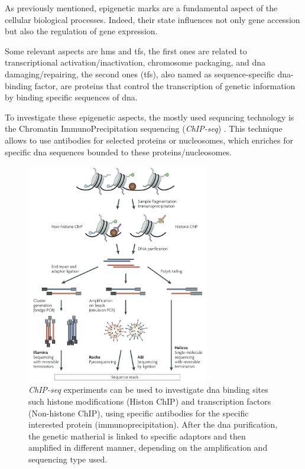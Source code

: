 As previously mentioned, epigenetic marks are a fundamental aspect of the cellular biological processes. 
Indeed, their state influences not only gene accession but also the regulation of gene expression.

Some relevant aspects are \glspl{hm} and \glspl{tf}, the first ones are related to transcriptional activation/inactivation, chromosome packaging, and \gls{dna} damaging/repairing, the second ones (\glspl{tf}), also named as sequence-specific \gls{dna}-binding factor, are proteins that control the transcription of genetic information by binding specific sequences of \gls{dna}.

To investigate these epigenetic aspects, the mostly used sequncing technology is the Chromatin ImmunoPrecipitation sequencing (\textit{ChIP-seq}) \cite{Park2009}.
This technique allows to use antibodies for selected proteins or nucleosomes, which enriches for specific \gls{dna} sequences bounded to these proteins/nucleosomes.

\begin{figure}[H]
\centering
\includegraphics[width=8cm, keepaspectratio]{img/intro/chip.png}
\caption[ChIP-seq experiment]{\textit{ChIP-seq} experiments can be used to investigate \gls{dna} binding sites such histone modifications (Histon ChIP) and transcription factors (Non-histone ChIP), using specific antibodies for the specific interested protein (immunoprecipitation).
After the \gls{dna} purification, the genetic matherial is linked to specific adaptors and then amplified in different manner, depending on the amplification and sequencing type used. \cite{Park2009}}
\label{fig:chipseqexp}
\end{figure}

